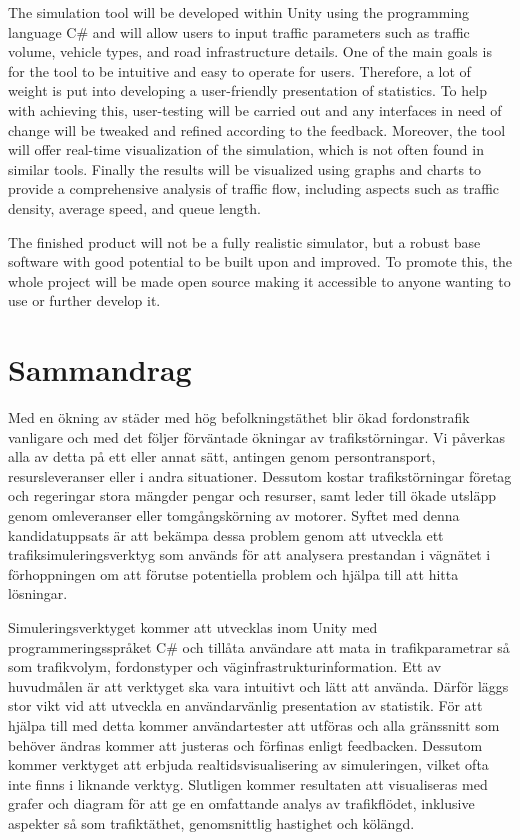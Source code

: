         The simulation tool will be developed within Unity using the programming language C\# and will allow users to input traffic parameters such as traffic volume, vehicle types, and road infrastructure details. One of the main goals is for the tool to be intuitive and easy to operate for users. Therefore, a lot of weight is put into developing a user-friendly presentation of statistics. To help with achieving this, user-testing will be carried out and any interfaces in need of change will be tweaked and refined according to the feedback. Moreover, the tool will offer real-time visualization of the simulation, which is not often found in similar tools. Finally the results will be visualized using graphs and charts to provide a comprehensive analysis of traffic flow, including aspects such as traffic density, average speed, and queue length.
    
        The finished product will not be a fully realistic simulator, but a robust base software with good potential to be built upon and improved. To promote this, the whole project will be made open source making it accessible to anyone wanting to use or further develop it.

\newpage
\section*{Sammandrag}
    Med en ökning av städer med hög befolkningstäthet blir ökad fordonstrafik vanligare och med det följer förväntade ökningar av trafikstörningar. Vi påverkas alla av detta på ett eller annat sätt, antingen genom persontransport, resursleveranser eller i andra situationer. Dessutom kostar trafikstörningar företag och regeringar stora mängder pengar och resurser, samt leder till ökade utsläpp genom omleveranser eller tomgångskörning av motorer. Syftet med denna kandidatuppsats är att bekämpa dessa problem genom att utveckla ett trafiksimuleringsverktyg som används för att analysera prestandan i vägnätet i förhoppningen om att förutse potentiella problem och hjälpa till att hitta lösningar.

    Simuleringsverktyget kommer att utvecklas inom Unity med programmeringsspråket C\# och tillåta användare att mata in trafikparametrar så som trafikvolym, fordonstyper och väginfrastrukturinformation. Ett av huvudmålen är att verktyget ska vara intuitivt och lätt att använda. Därför läggs stor vikt vid att utveckla en användarvänlig presentation av statistik. För att hjälpa till med detta kommer användartester att utföras och alla gränssnitt som behöver ändras kommer att justeras och förfinas enligt feedbacken. Dessutom kommer verktyget att erbjuda realtidsvisualisering av simuleringen, vilket ofta inte finns i liknande verktyg. Slutligen kommer resultaten att visualiseras med grafer och diagram för att ge en omfattande analys av trafikflödet, inklusive aspekter så som trafiktäthet, genomsnittlig hastighet och kölängd. 


